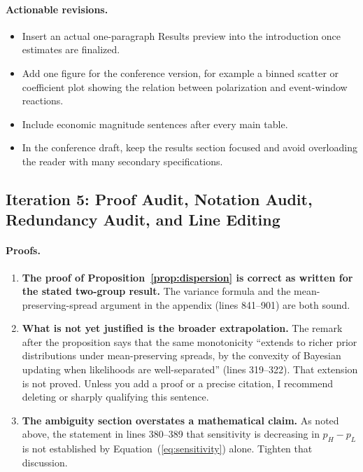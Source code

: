\documentclass[12pt]{article}
\begin{document}
\paragraph{Actionable revisions.}
\begin{itemize}
    \item Insert an actual one-paragraph Results preview into the introduction once estimates are finalized.
    \item Add one figure for the conference version, for example a binned scatter or coefficient plot showing the relation between polarization and event-window reactions.
    \item Include economic magnitude sentences after every main table.
    \item In the conference draft, keep the results section focused and avoid overloading the reader with many secondary specifications.
\end{itemize}

\subsection*{Iteration 5: Proof Audit, Notation Audit, Redundancy Audit, and Line Editing}

\paragraph{Proofs.}

\begin{enumerate}
    \item \textbf{The proof of Proposition~\ref{prop:dispersion} is correct as written for the stated two-group result.} The variance formula and the mean-preserving-spread argument in the appendix (lines 841--901) are both sound.

    \item \textbf{What is not yet justified is the broader extrapolation.} The remark after the proposition says that the same monotonicity ``extends to richer prior distributions under mean-preserving spreads, by the convexity of Bayesian updating when likelihoods are well-separated'' (lines 319--322). That extension is not proved. Unless you add a proof or a precise citation, I recommend deleting or sharply qualifying this sentence.

    \item \textbf{The ambiguity section overstates a mathematical claim.} As noted above, the statement in lines 380--389 that sensitivity is decreasing in $p_H-p_L$ is not established by Equation~(\ref{eq:sensitivity}) alone. Tighten that discussion.
\end{enumerate}
\end{document}
